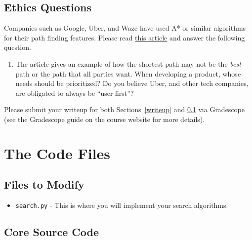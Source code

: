 \documentclass{article}
\begin{document}
\subsection{Ethics Questions} \label{ethics}
Companies such as Google, Uber, and Waze have used A* or similar algorithms for
their path finding features. Please read \href{https://arstechnica.com/tech-policy/2017/04/uber-said-to-use-sophisticated-software-to-defraud-drivers-passengers/}{this article}
and answer the following question.
\begin{enumerate}
    \item The article gives an example of how the shortest path may not be the \textit{best} path or the path that all parties want. When developing a product, whose needs should be prioritized? Do you believe Uber, and other tech companies, are obligated to always be “user first”?
\end{enumerate}


\noindent
Please submit your writeup for both Sections~\ref{writeup} and \ref{ethics} via Gradescope (see the Gradescope guide on the course website for more details).


\section{The Code Files}

\subsection{Files to Modify}

\begin{itemize}

\item \verb|search.py| - This is where you will implement your search algorithms.

\end{itemize}


\subsection{Core Source Code}
\end{document}
